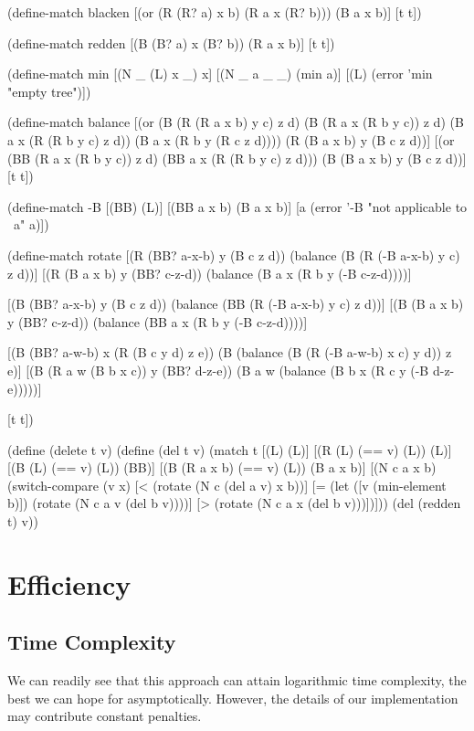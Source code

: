 \documentclass[preprint]{sigplanconf}
\begin{document}
\begin{schemedisplay}
(define-match blacken
  [(or (R (R? a) x b)
       (R a x (R? b)))
   (B a x b)]
  [t t])

(define-match redden
  [(B (B? a) x (B? b))
   (R a x b)]
  [t t])

(define-match min
  [(N _ (L) x _) x]
  [(N _ a _ _) (min a)]
  [(L) (error 'min "empty tree")])

(define-match balance
  [(or (B (R (R a x b) y c) z d)
       (B (R a x (R b y c)) z d)
       (B a x (R (R b y c) z d))
       (B a x (R b y (R c z d))))
   (R (B a x b) y (B c z d))]
  [(or (BB (R a x (R b y c)) z d)
       (BB a x (R (R b y c) z d)))
   (B (B a x b) y (B c z d))]
  [t t])

(define-match -B
  [(BB) (L)]
  [(BB a x b) (B a x b)]
  [a (error '-B "not applicable to ~a" a)])

(define-match rotate
  [(R (BB? a-x-b) y (B c z d))
   (balance (B (R (-B a-x-b) y c) z d))]
  [(R (B a x b) y (BB? c-z-d))
   (balance (B a x (R b y (-B c-z-d))))]
  
  [(B (BB? a-x-b) y (B c z d))
   (balance (BB (R (-B a-x-b) y c) z d))]
  [(B (B a x b) y (BB? c-z-d))
   (balance (BB a x (R b y (-B c-z-d))))]
  
  [(B (BB? a-w-b) x (R (B c y d) z e))
   (B (balance (B (R (-B a-w-b) x c) y d)) z e)]
  [(B (R a w (B b x c)) y (BB? d-z-e))
   (B a w (balance (B b x (R c y (-B d-z-e)))))]
  
  [t t])

(define (delete t v)
  (define (del t v)
    (match t
      [(L) (L)]
      [(R (L) (== v) (L))
       (L)]
      [(B (L) (== v) (L))
       (BB)]
      [(B (R a x b) (== v) (L))
       (B a x b)]
      [(N c a x b)
       (switch-compare
        (v x)
        [< (rotate (N c (del a v) x b))]
        [= (let ([v (min-element b)])
             (rotate (N c a v (del b v))))]
        [> (rotate (N c a x (del b v)))])]))
  (del (redden t) v))
\end{schemedisplay}

\section{Efficiency}

\subsection{Time Complexity}

We can readily see that this approach can attain logarithmic time complexity, the best we can hope for asymptotically. However, the details of our implementation may contribute constant penalties.
\end{document}
